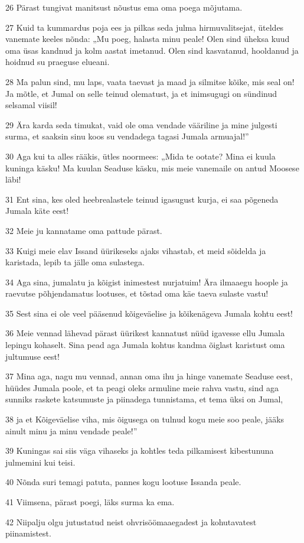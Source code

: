 \par 26 Pärast tungivat manitsust nõustus ema oma poega mõjutama.
\par 27 Kuid ta kummardus poja ees ja pilkas seda julma hirmuvalitsejat, üteldes vanemate keeles nõnda: „Mu poeg, halasta minu peale! Olen sind üheksa kuud oma üsas kandnud ja kolm aastat imetanud. Olen sind kasvatanud, hooldanud ja hoidnud su praeguse elueani.
\par 28 Ma palun sind, mu laps, vaata taevast ja maad ja silmitse kõike, mis seal on! Ja mõtle, et Jumal on selle teinud olematust, ja et inimsugugi on sündinud selsamal viisil!
\par 29 Ära karda seda timukat, vaid ole oma vendade vääriline ja mine julgesti surma, et saaksin sinu koos su vendadega tagasi Jumala armuajal!”
\par 30 Aga kui ta alles rääkis, ütles noormees: „Mida te ootate? Mina ei kuula kuninga käsku! Ma kuulan Seaduse käsku, mis meie vanemaile on antud Moosese läbi!
\par 31 Ent sina, kes oled heebrealastele teinud igasugust kurja, ei saa põgeneda Jumala käte eest!
\par 32 Meie ju kannatame oma pattude pärast.
\par 33 Kuigi meie elav Issand üürikeseks ajaks vihastab, et meid sõidelda ja karistada, lepib ta jälle oma sulastega.
\par 34 Aga sina, jumalatu ja kõigist inimestest nurjatuim! Ära ilmaaegu hoople ja raevutse põhjendamatus lootuses, et tõstad oma käe taeva sulaste vastu!
\par 35 Sest sina ei ole veel pääsenud kõigeväelise ja kõikenägeva Jumala kohtu eest!
\par 36 Meie vennad lähevad pärast üürikest kannatust nüüd igavesse ellu Jumala lepingu kohaselt. Sina pead aga Jumala kohtus kandma õiglast karistust oma jultumuse eest!
\par 37 Mina aga, nagu mu vennad, annan oma ihu ja hinge vanemate Seaduse eest, hüüdes Jumala poole, et ta peagi oleks armuline meie rahva vastu, sind aga sunniks raskete katsumuste ja piinadega tunnistama, et tema üksi on Jumal,
\par 38 ja et Kõigeväelise viha, mis õigusega on tulnud kogu meie soo peale, jääks ainult minu ja minu vendade peale!”
\par 39 Kuningas sai siis väga vihaseks ja kohtles teda pilkamisest kibestununa julmemini kui teisi.
\par 40 Nõnda suri temagi patuta, pannes kogu lootuse Issanda peale.
\par 41 Viimsena, pärast poegi, läks surma ka ema.
\par 42 Niipalju olgu jutustatud neist ohvrisöömaaegadest ja kohutavatest piinamistest.



